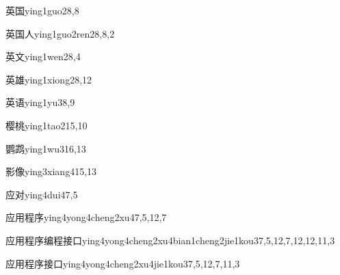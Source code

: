 \begin{verbete}{英国}{ying1guo2}{8,8}
\end{verbete}

\begin{verbete}{英国人}{ying1guo2ren2}{8,8,2}
\end{verbete}

\begin{verbete}{英文}{ying1wen2}{8,4}
\end{verbete}

\begin{verbete}{英雄}{ying1xiong2}{8,12}
\end{verbete}

\begin{verbete}{英语}{ying1yu3}{8,9}
\end{verbete}

\begin{verbete}{樱桃}{ying1tao2}{15,10}
\end{verbete}

\begin{verbete}{鹦鹉}{ying1wu3}{16,13}
\end{verbete}

\begin{verbete}{影像}{ying3xiang4}{15,13}
\end{verbete}

\begin{verbete}{应对}{ying4dui4}{7,5}
\end{verbete}

\begin{verbete}{应用程序}{ying4yong4cheng2xu4}{7,5,12,7}
\end{verbete}

\begin{verbete}{应用程序编程接口}{ying4yong4cheng2xu4bian1cheng2jie1kou3}{7,5,12,7,12,12,11,3}
\end{verbete}

\begin{verbete}{应用程序接口}{ying4yong4cheng2xu4jie1kou3}{7,5,12,7,11,3}
\end{verbete}


